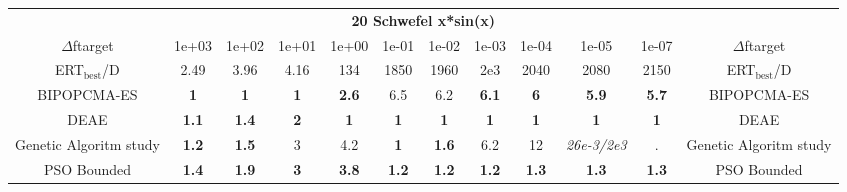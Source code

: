 \begin{tabular}{cccccccccccc}
 & \multicolumn{10}{c}{{\normalsize \textbf{20 Schwefel x*sin(x)}}}\\
$\Delta$ftarget& 1e+03& 1e+02& 1e+01& 1e+00& 1e-01& 1e-02& 1e-03& 1e-04& 1e-05& 1e-07 & $\Delta$ftarget \\
ERT$_{\textrm{best}}$/D& 2.49& 3.96& 4.16& 134& 1850& 1960& 2e3& 2040& 2080& 2150 & ERT$_{\textrm{best}}$/D \\
\hline
BIPOPCMA-ES & \textbf{1} & \textbf{1} & \textbf{1} & \textbf{2.6} & 6.5 & 6.2 & \textbf{6.1} & \textbf{6} & \textbf{5.9} & \textbf{5.7} & BIPOPCMA-ES \cite{add_an_entry_for_BIPOPCMA-ES_in_bbob.bib}\\
DEAE & \textbf{1.1} & \textbf{1.4} & \textbf{2} & \textbf{1} & \textbf{1} & \textbf{1} & \textbf{1} & \textbf{1} & \textbf{1} & \textbf{1} & DEAE \cite{add_an_entry_for_DEAE_in_bbob.bib}\\
Genetic Algoritm study & \textbf{1.2} & \textbf{1.5} & 3 & 4.2 & \textbf{1} & \textbf{1.6} & 6.2 & 12 & \textit{26e-3}\textit{/2e3} & . & Genetic Algoritm study \cite{add_an_entry_for_Genetic Algoritm study_in_bbob.bib}\\
PSO Bounded & \textbf{1.4} & \textbf{1.9} & \textbf{3} & \textbf{3.8} & \textbf{1.2} & \textbf{1.2} & \textbf{1.2} & \textbf{1.3} & \textbf{1.3} & \textbf{1.3} & PSO Bounded \cite{add_an_entry_for_PSO Bounded_in_bbob.bib}
\end{tabular}
